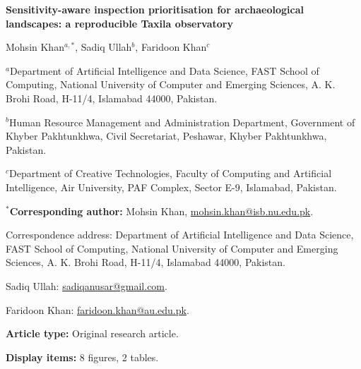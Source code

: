 \documentclass[11pt,a4paper]{article}
\begin{document}
\raggedright
\begin{center}{\Large\bfseries Sensitivity-aware inspection prioritisation for archaeological landscapes: a reproducible Taxila observatory}\par\bigskip
Mohsin Khan$^{a,*}$, Sadiq Ullah$^b$, Faridoon Khan$^c$\end{center}
\noindent $^a$Department of Artificial Intelligence and Data Science, FAST School of Computing, National University of Computer and Emerging Sciences, A. K. Brohi Road, H-11/4, Islamabad 44000, Pakistan.\par\medskip
\noindent $^b$Human Resource Management and Administration Department, Government of Khyber Pakhtunkhwa, Civil Secretariat, Peshawar, Khyber Pakhtunkhwa, Pakistan.\par\medskip
\noindent $^c$Department of Creative Technologies, Faculty of Computing and Artificial Intelligence, Air University, PAF Complex, Sector E-9, Islamabad, Pakistan.\par\medskip
\noindent $^*$\textbf{Corresponding author:} Mohsin Khan,
\href{mailto:mohsin.khan@isb.nu.edu.pk}{mohsin.khan@isb.nu.edu.pk}.\par
\noindent Correspondence address: Department of Artificial Intelligence and Data Science, FAST School of Computing, National University of Computer and Emerging Sciences, A. K. Brohi Road, H-11/4, Islamabad 44000, Pakistan.\par\medskip
\noindent Sadiq Ullah: \href{mailto:sadiqanusar@gmail.com}{sadiqanusar@gmail.com}.\par
\noindent Faridoon Khan: \href{mailto:faridoon.khan@au.edu.pk}{faridoon.khan@au.edu.pk}.\par\medskip
\noindent \textbf{Article type:} Original research article.\par
\noindent \textbf{Display items:} 8 figures, 2 tables.
\end{document}
